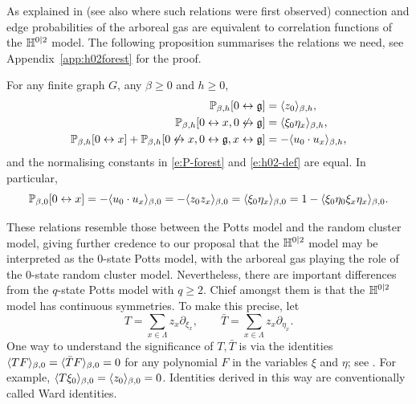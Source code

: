 \documentclass[11pt]{amsart}
\numberwithin{equation}{section}
\numberwithin{theorem}{section}
\newcommand{\ghost}{\mathfrak{g}}
\newcommand{\conn}{\leftrightarrow}
\newcommand{\nconn}{\not\leftrightarrow}
\newcommand{\1}{{\bf 1}}
\begin{document}
As explained in \cite[Section~2.1]{MR4218682} (see also
\cite{MR2110547} where such relations were first observed) connection
and edge probabilities of the arboreal gas are equivalent to
correlation functions of the $\mathbb{H}^{0|2}$ model.  The following
proposition summarises the relations we need, see
Appendix~\ref{app:h02forest} for the proof.

\begin{proposition}
  \label{prop:h02-forest}
  For any finite graph $G$,
  any $\beta \geq 0$ and $h \geq 0$,
  \begin{align} \label{e:zforest}
  \P_{\beta,h}[0\conn \ghost] &= \avg{z_0}_{\beta,h},
    \\
    \label{e:xietaforest}
    \P_{\beta,h}[0\conn x, 0 \nconn \ghost] &= \avg{\xi_0\eta_x}_{\beta,h},\\
  \label{e:u0uxforest}
  \P_{\beta,h}[0\conn x]+\P_{\beta,h}[0\nconn x, 0\conn \ghost, x\conn\ghost]  &= -\avg{u_0\cdot u_x}_{\beta,h}
  ,
  \end{align}
  and the normalising constants in \eqref{e:P-forest} and \eqref{e:h02-def} are equal.
  In particular,
  \begin{equation} \label{e:P0x4pt}
    \P_{\beta,0}[0\conn x] = -\avg{u_0\cdot u_x}_{\beta,0} = -\avg{z_0z_x}_{\beta,0} = \avg{\xi_0\eta_x}_{\beta,0} = 1-\avg{\xi_0\eta_0\xi_x\eta_x}_{\beta,0}.
  \end{equation}
\end{proposition}

These relations resemble those between the Potts model and the random
cluster model, giving further credence to our proposal that the
$\mathbb{H}^{0|2}$ model may be interpreted as the $0$-state Potts model,
with the arboreal gas playing the role of the $0$-state random cluster
model.  Nevertheless, there are important differences from the
$q$-state Potts model with $q \geq 2$.  Chief amongst them is that the
$\mathbb{H}^{0|2}$ model has continuous symmetries. To make this precise, let
\begin{equation} \label{e:Tdef}
  T=\sum_{x\in\Lambda} z_x \partial_{\xi_x}, \qquad
  \bar T=\sum_{x\in\Lambda} z_x \partial_{\eta_x}
  .
\end{equation}
One way to understand the significance of $T, \bar{T}$ is via the
identities $\langle TF \rangle_{\beta,0}=\langle \bar T F \rangle_{\beta,0}=0$ for any
polynomial $F$ in the variables $\xi$ and $\eta$; see
\cite[Section~2.2]{MR4218682}. For example,
$\langle T\xi_{0} \rangle_{\beta,0}=\langle z_{0} \rangle_{\beta,0}=0$. Identities derived
in this way are conventionally called Ward identities.
\end{document}
